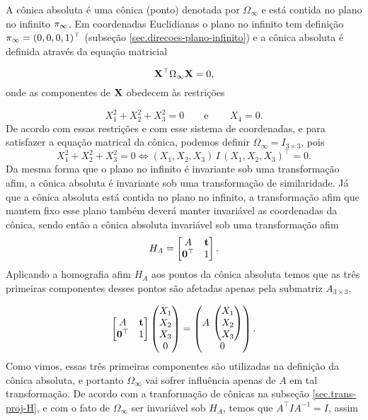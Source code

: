 A cônica absoluta é uma cônica (ponto) denotada por $\Omega_\infty$ e está contida no plano no infinito $\pi_\infty$. Em coordenadas Euclidianas o plano no infinito tem definição $\pi_\infty=(0,0,0,1)^\top$ (subseção \ref{sec.direcoes-plano-infinito}) e a cônica absoluta é definida através da equação matricial

\begin{equation*}
\mathbf{X}^\top\Omega_\infty\mathbf{X}=0,
\end{equation*} 
onde as componentes de $\mathbf{X}$ obedecem às restrições

\begin{equation*}
X_1^2+X_2^2+X_3^2=0\qquad\text{e}\qquad\,X_4=0.
\end{equation*}
De acordo com essas restrições e com esse sistema de coordenadas, e para satisfazer a equação matrical da cônica, podemos definir $\Omega_\infty=I_{3\times3}$, pois
\begin{equation*}
X_1^2+X_2^2+X_3^2=0\Leftrightarrow(X_1,X_2,X_3)\,I\,(X_1,X_2,X_3)^\top=0.
\end{equation*}
Da mesma forma que o plano no infinito é invariante sob uma transformação afim, a cônica absoluta é invariante sob uma transformação de similaridade. Já que a cônica absoluta está contida no plano no infinito, a transformação afim que mantem fixo esse plano também deverá manter invariável as coordenadas da cônica, sendo então a cônica absoluta invariável sob uma transformação afim
\begin{equation*}
H_A=
\begin{bmatrix}
A&{\bf t}\\
{\bf 0}^\top&1
\end{bmatrix}.
\end{equation*}
Aplicando a homografia afim $H_A$ aos pontos da cônica absoluta temos que as três primeiras componentes desses pontos são afetadas apenas pela submatriz $A_{3\times3}$,

\begin{equation*}
\begin{bmatrix}
A&{\bf t}\\
{\bf 0}^\top&1
\end{bmatrix}
\begin{pmatrix}
X_1\\
X_2\\
X_3\\
0
\end{pmatrix}
=
\begin{pmatrix}
A\,
\begin{pmatrix}
X_1\\
X_2\\
X_3
\end{pmatrix}\\
0
\end{pmatrix}.
\end{equation*}
Como vimos, essas três primeiras componentes são utilizadas na definição da cônica absoluta, e portanto $\Omega_\infty$ vai sofrer influência apenas de $A$ em tal transformação. 
De acordo com a tranformação de cônicas na subseção \ref{sec.trans-proj-H}, e com o fato de $\Omega_\infty$ ser invariável sob 
$H_A$, temos que $A^\top I A^{-1}=I$, assim

